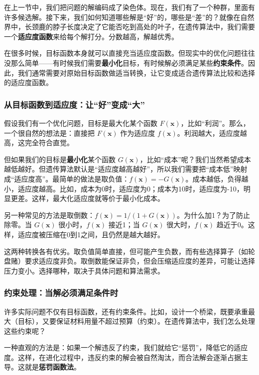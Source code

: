 \documentclass[lang=cn,zihao=-4,a4paper,fontset=windows]{beautybook}
\begin{document}
在上一节中，我们把问题的解编码成了染色体。现在，我们有了一个种群，里面有许多候选解。接下来，我们如何知道哪些解是“好”的，哪些是“差”的？就像在自然界中，长颈鹿的脖子长度决定了它能否吃到高处的叶子，在遗传算法中，我们需要一个\textbf{适应度函数}来给每个解打分。分数越高，解越优秀。

在很多时候，目标函数本身就可以直接充当适应度函数。但现实中的优化问题往往没那么简单——有时候我们需要\textbf{最小化}目标，有时候解必须满足某些\textbf{约束条件}。因此，我们通常需要对原始目标函数做适当转换，让它变成适合遗传算法比较和选择的适应度函数。

\subsubsection{从目标函数到适应度：让“好”变成“大”}

假设我们有一个优化问题，目标是最大化某个函数 $F(\mathbf{x})$，比如“利润”。那么，一个很自然的想法是：直接把 $F(\mathbf{x})$ 作为适应度 $f(\mathbf{x})$。利润越大，适应度越高，这完全符合直觉。

但如果我们的目标是\textbf{最小化}某个函数 $G(\mathbf{x})$，比如“成本”呢？我们当然希望成本越低越好。但遗传算法默认是“适应度越高越好”，所以我们需要把“成本低”映射成“适应度高”。最简单的做法是取负值：$f(\mathbf{x}) = -G(\mathbf{x})$。成本越低，负得越小，适应度越高。比如，成本为0时，适应度为0；成本为10时，适应度为-10，明显更差。这样，最大化适应度就等价于最小化成本。

另一种常见的方法是取倒数：$f(\mathbf{x}) = 1 / (1 + G(\mathbf{x}))$。为什么加1？为了防止除零。当 $G(\mathbf{x})$ 很小时，$f(\mathbf{x})$ 接近1；当 $G(\mathbf{x})$ 很大时，$f(\mathbf{x})$ 趋近于0。这样，适应度被压缩在0到1之间，且仍然是越大越好。

这两种转换各有优劣。取负值简单直接，但可能产生负数，而有些选择算子（如轮盘赌）要求适应度非负。取倒数能保证非负，但会压缩适应度的差异，可能让选择压力变小。选择哪种，取决于具体问题和算法需求。

\subsubsection{约束处理：当解必须满足条件时}

许多实际问题不仅有目标函数，还有约束条件。比如，设计一个桥梁，既要承重最大（目标），又要保证材料用量不超过预算（约束）。在遗传算法中，我们怎么处理这些约束呢？

一种直观的方法是：如果一个解违反了约束，我们就给它“惩罚”，降低它的适应度。这样，在进化过程中，违反约束的解会被自然淘汰，而合法解会逐渐占据主导。这就是\textbf{惩罚函数法}。
\end{document}
